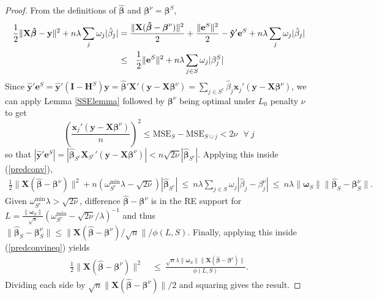 \documentclass[12pt]{article}
\newcommand{\bs}[1]{\boldsymbol{#1}}
\newcommand{\mr}[1]{\mathrm{#1}}
\newcommand{\bm}[1]{\mathbf{#1}}
\begin{document}
\begin{proof}
From the definitions of $\bs{\hat\beta}$ and $\bs{\beta}^\nu = \bs{\beta}^S$, 
\begin{align}\label{predconv}
\frac{1}{2}\|\bm{X}\bs{\hat \beta}-\bm{y}\|^2 +  n\lambda\sum_j\omega_j|\hat\beta_j|   &= \frac{\|\bm{X}(\bs{\hat\beta}-\bs{\beta}^\nu)\|^2}{2} + \frac{\|\bm{e}^S\|^2}{2} - \bm{\hat y}'\bm{e}^S+ n\lambda\sum_j\omega_j|\hat\beta_j| 
\\&\leq~~\frac{1}{2}\|\bm{e}^S\|^2 + n\lambda\sum_{j\in S}\omega_j|\beta^S_j|\notag
\end{align}
  Since $\bm{\hat y}'\bm{e}^S = \bm{\hat y}'(\bm{I}-\bm{H}^S)\bm{y} =
\bs{\hat\beta}'\bm{X}'(\bm{y}-\bm{X}\bs{\beta}^\nu) = 
\sum_{j\in S^c} \hat\beta_j\bs{x}_j'(\bm{y}-\bm{X}\bs{\beta}^\nu)
$,
 we can apply Lemma \ref{SSElemma} followed by $\bs{\beta}^\nu$ being optimal under $L_0$ penalty $\nu$ to get 
\begin{equation} \label{L0ineq}
\left(\frac{\bs{x}_j'(\bm{y}-\bm{X}\bs{\beta}^\nu)}{n}\right)^2
\leq \mr{MSE}_S - \mr{MSE}_{S\cup j} < 2\nu ~~~\forall~j
\end{equation}
so that $|\bm{\hat y}'\bm{e}^S| = |\bs{\hat\beta}_{S^c}\bm{X}_{S^c}'(\bm{y}-\bm{X}\bs{\beta}^\nu)| < n\sqrt{2\nu}|\bs{\hat\beta}_{S^c}|$.  Applying this inside (\ref{predconv}),
\begin{align}\label{predconvineq}
\frac{1}{2}\|\bm{X}(\bs{\hat\beta}-\bs{\beta}^\nu)\|^2
  + n\left(\omega^{\mr{min}}_{S^c}\lambda-\sqrt{2\nu}\right)|\bs{\hat\beta}_{S^c}|
  ~\leq~ n\lambda\sum_{j\in S}\omega_j|\hat\beta_{j}-\beta^\nu_j|
  ~\leq~ n\lambda\|\bs{\omega}_S\|\|\bs{\hat\beta}_{S}-\bs{\beta}^\nu_S\|.
\end{align}
Given $\omega^{\mr{min}}_{S^c}\lambda > \sqrt{2\nu}$,
difference $\bs{\hat\beta}-\bs{\beta}^\nu$ is in the RE support for 
$L=\frac{\|\bs{\omega}_S\|}{\sqrt{s}}(\omega^{\mr{min}}_{S^c}-\sqrt{2\nu}/\lambda)^{-1}$ and thus $\|\bs{\hat\beta}_{S}-\bs{\beta}^\nu_S\| \leq \|\bm{X}(\bs{\hat\beta}-\bs{\beta}^\nu)/\sqrt{n}\|/\phi(L,S)$.  Finally, applying this inside (\ref{predconvineq}) yields
\begin{align}
\frac{1}{2}\|\bm{X}(\bs{\hat\beta}-\bs{\beta}^\nu)\|^2
  &~\leq~ \frac{\sqrt{n}\lambda\|\bs{\omega}_S\|\|\bm{X}(\bs{\hat\beta}-\bs{\beta}^\nu)\|}
  {\phi(L, S)}.
\end{align}
Dividing each side by $\sqrt{n}\|\bm{X}(\bs{\hat\beta}-\bs{\beta}^\nu)\|/2$ and squaring gives the result.
\end{proof}
\end{document}
